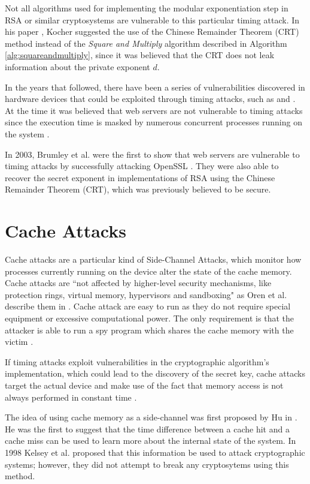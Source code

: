 \documentclass[10pt,a4paper,twoside]{book}
\begin{document}
Not all algorithms used for implementing the modular exponentiation step in RSA or similar cryptosystems are vulnerable to this particular timing attack. In his paper \cite{kocher1996timing}, Kocher suggested the use of the Chinese Remainder Theorem (CRT) method instead of the \textit{Square and Multiply} algorithm described in Algorithm \ref{alg:squareandmultiply}, since it was believed that the CRT does not leak information about the private exponent $d$.

In the years that followed, there have been a series of vulnerabilities discovered in hardware devices that could be exploited through timing attacks, such as \cite{dhem1998practical} and \cite{schindler2000timing}. At the time it was believed that web servers are not vulnerable to timing attacks since the execution time is masked by numerous concurrent processes running on the system \cite{brumley2005remote}.

In 2003, Brumley et al. \cite{brumley2005remote} were the first to show that web servers are vulnerable to timing attacks by successfully attacking OpenSSL \cite{openssl}. They were also able to recover the secret exponent in implementations of RSA using the Chinese Remainder Theorem (CRT), which was previously believed to be secure. 

\section{Cache Attacks}
\label{tb:cacheAttacks}
Cache attacks are a particular kind of Side-Channel Attacks, which monitor how processes currently running on the device alter the state of the cache memory. Cache attacks are ``not affected by higher-level security mechanisms, like protection rings, virtual memory, hypervisors and sandboxing" as Oren et al. describe them in \cite{oren2015spy}. Cache attack are easy to run as they do not require special equipment or excessive computational power. The only requirement is that the attacker is able to run a spy program which shares the cache memory with the victim \cite{oren2015spy}.

If timing attacks exploit vulnerabilities in the cryptographic algorithm's implementation, which could lead to the discovery of the secret key, cache attacks target the actual device and make use of the fact that memory access is not always performed in constant time \cite{canteaut2006understanding}.

The idea of using cache memory as a side-channel was first proposed by Hu in \cite{hu1992lattice}. He was the first to suggest that the time difference between a cache hit and a cache miss can be used to learn more about the internal state of the system. In 1998 Kelsey et al. \cite{kelsey1998side} proposed that this information be used to attack cryptographic systems; however, they did not attempt to break any cryptosytems using this method.
\end{document}
